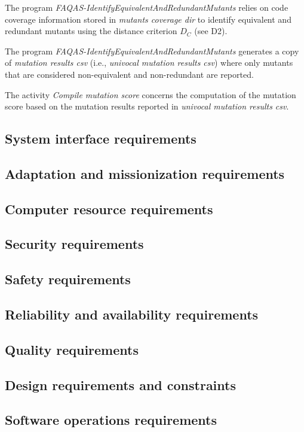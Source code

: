 \RQ{} The program \emph{FAQAS-IdentifyEquivalentAndRedundantMutants} relies on code coverage information stored in \emph{mutants coverage dir} to identify equivalent and redundant mutants using the distance criterion $D_C$ (see D2).

\RQ{} The program \emph{FAQAS-IdentifyEquivalentAndRedundantMutants} generates a copy of \emph{mutation results csv} (i.e., \emph{univocal mutation results csv}) where only mutants that are considered non-equivalent and non-redundant are reported.

\RQ{} The activity \emph{Compile mutation score} concerns the computation of the mutation score based on the mutation results reported in \emph{univocal mutation results csv}.

\subsection{System interface requirements}
\subsection{Adaptation and missionization requirements }
\subsection{Computer resource requirements}
\subsection{Security requirements }
\subsection{Safety requirements}
\subsection{Reliability and availability requirements}
\subsection{Quality requirements}
\subsection{Design requirements and constraints}
\subsection{Software operations requirements}
